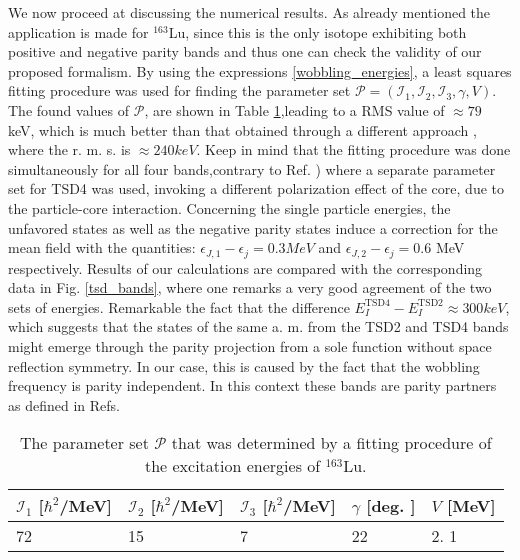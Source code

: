 \documentclass[twocolumn,article,amsmath,amssymb,floatfix,aps]{revtex4}
\begin{document}
We  now  proceed at discussing the numerical results.  As already mentioned  the application is made for $^{163}$Lu, since this is the only isotope exhibiting both positive and negative parity bands
and thus one can check the validity of our proposed formalism. 
 By using the expressions \ref{wobbling_energies}, a least squares fitting procedure was used for finding the parameter set $\mathcal{P}=(\mathcal{I}_1,\mathcal{I}_2,\mathcal{I}_3,\gamma,V)$.  The found values of $\mathcal{P}$, are  shown in Table \ref{parameter_set},leading to a RMS value of $\approx 79$ keV, which is much better than that obtained through a different approach
 \cite{raduta2020new}, where the r. m. s.  is $\approx 240 keV$.  Keep in mind that the fitting procedure was done simultaneously for all four bands,contrary to Ref. \cite{raduta2020new}) where a separate parameter set for TSD4 was used, invoking a different polarization effect of the core, due to the particle-core interaction.  Concerning the single particle energies, the unfavored states as well as the negative parity states induce a correction for the mean field with the quantities: $\epsilon_{J,1}-\epsilon_{j}=0. 3MeV$ and $\epsilon_{J,2}-\epsilon_{j}=0. 6$ MeV respectively.  Results of our calculations are compared with the corresponding data in Fig.  \ref{tsd_bands}, where one remarks a very good agreement of the two sets of energies.  Remarkable the fact that the difference $E_I^\text{TSD4}-E_I^\text{TSD2}\approx 300 keV$, which suggests that the states of the same a. m.  from the TSD2 and TSD4 bands might emerge through the parity projection from a sole function without space reflection symmetry.  In our case, this is caused by the fact that the wobbling frequency is parity independent.  In this context these bands are parity partners
as defined in Refs.  \cite{chas,Rad1,Rad2,Rad3}

\begin{table}[h]
    \centering
  \begin{tabular}{lllll}
  \hline
$\mathcal{I}_1$ [$\hbar^2$/MeV] & $\mathcal{I}_2$ [$\hbar^2$/MeV]& $\mathcal{I}_3$ [$\hbar^2$/MeV] & $\gamma$ [deg. ] & $V$ [MeV] \\
\hline
\hline
72              & 15              & 7               & 22       & 2. 1
\end{tabular}
    \caption{The parameter set $\mathcal{P}$ that was determined by a fitting procedure of the excitation energies of $^{163}$Lu. }
    \label{parameter_set}
\end{table}
\end{document}
